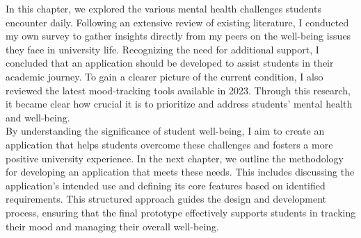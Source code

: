 In this chapter, we explored the various mental health challenges students encounter daily. Following an extensive review of existing literature, I conducted my own survey to gather insights directly from my peers on the well-being issues they face in university life. Recognizing the need for additional support, I concluded that an application should be developed to assist students in their academic journey. To gain a clearer picture of the current condition, I also reviewed the latest mood-tracking tools available in 2023. Through this research, it became clear how crucial it is to prioritize and address students' mental health and well-being.\vspace{5mm} \\
By understanding the significance of student well-being, I aim to create an application that helps students overcome these challenges and fosters a more positive university experience. In the next chapter, we outline the methodology for developing an application that meets these needs. This includes discussing the application's intended use and defining its core features based on identified requirements. This structured approach guides the design and development process, ensuring that the final prototype effectively supports students in tracking their mood and managing their overall well-being.